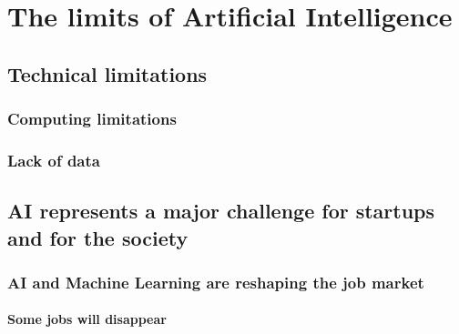 \documentclass[12pt]{article}
\begin{document}
\pagebreak


\section{The limits of Artificial Intelligence}

\subsection{Technical limitations}

\subsubsection{Computing limitations}

\subsubsection{Lack of data}

\subsection{AI represents a major challenge for startups and for the society}

\subsubsection{AI and Machine Learning are reshaping the job market}

\paragraph{Some jobs will disappear}
\end{document}
